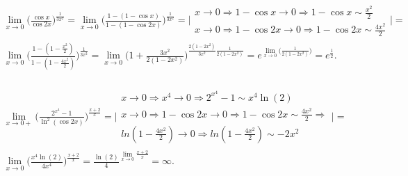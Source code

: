 \documentclass[12pt]{article}
\begin{document}
	$$
	\begin{array} {l}
	\lim\limits_ {x \rightarrow 0} \biggl ( \frac { \cos {x}} { \cos {2x}} \biggr ) ^ {\frac {1}{3x^2}} =
	\lim\limits_ {x \rightarrow 0} \biggl ( \frac { 1 - (1 - \cos {x})} {1 - (1 - \cos {2x})} \biggr ) ^ {\frac {1}{3x^2}} =
	\biggl |
	\begin {array} {l}
		x \rightarrow 0 \Rightarrow
		1 - \cos{x} \rightarrow 0 \Rightarrow 1 - \cos{x} \sim \frac{x^2}{2} \\
		x \rightarrow 0 \Rightarrow
		1 - \cos{2x} \rightarrow 0 \Rightarrow 1 - \cos{2x} \sim \frac{4x^2}{2}
	\end{array}
	\biggr | = \\
	\lim \limits_ {x \rightarrow 0} \biggl ( \frac { 1 - (1 - \frac{x^2}{2})} {1 - (1 - \frac{4x^2}{2})} \biggr ) ^ {\frac {1}{3x^2}} = 
	\lim \limits_ {x \rightarrow 0} \biggl ( 1 + \frac {3x^2} {2(1-2x^2)} \biggr ) ^ {\frac {2(1-2x^2)} {3x^2} \frac {1}{2(1-2x^2)}} = 
	e^ {\lim\limits_ {x \rightarrow 0} \biggl (\frac {1}{2(1-2x^2)} \biggr )} = 
	e^ { \frac{1}{2} }. \\
	\end{array}
	$$
	
	$$
	\begin{array} {l}
	\lim \limits_ {x \rightarrow 0+ } \biggl( \frac {2^{x^4} - 1} {\ln^2 (\cos {2x})} \biggr) ^ {\frac {x+2}{x}}  =
	\biggl |
	\begin{array} {l}
		x \rightarrow 0 \Rightarrow
		x^4 \rightarrow 0 \Rightarrow 2^{x^4} - 1 \sim x^4 \ln(2) \\
		x \rightarrow 0 \Rightarrow
		1 - \cos{2x} \rightarrow 0 \Rightarrow 1 - \cos{2x} \sim \frac{4x^2}{2} \Rightarrow\\
		ln(1 - \frac{4x^2}{2}) \rightarrow 0 \Rightarrow ln(1 - \frac{4x^2}{2}) \sim -2x^2
	\end{array}
	\biggr | = \\
	\lim \limits_ {x \rightarrow 0}  \biggl( \frac {x^4 \ln(2)} {4x^4} \biggr) ^ {\frac {x+2}{x}} =
	\frac {\ln(2)}{4} ^ {\lim\limits_ {x \rightarrow 0} \frac {x+2}{x}}  =\infty.
	\end{array}
	$$
	
\end{document}
